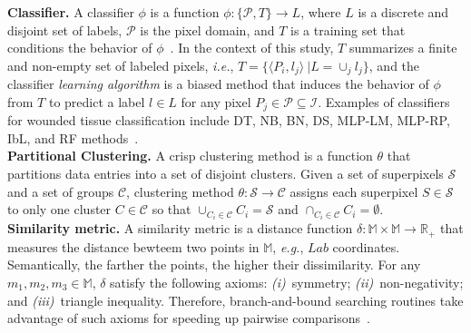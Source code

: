 \noindent
\textbf{Classifier.}
A classifier $\phi$ is a function $\phi: \{\mathcal{P}, T\} \rightarrow L$, where $L$ is a discrete and disjoint set of labels, $\mathcal{P}$ is the pixel domain, and $T$ is a training set that conditions the behavior of $\phi$~\cite{Aggarwal2015}.
In the context of this study, $T$ summarizes a finite and non-empty set of labeled pixels, \textit{i.e.}, $T = \{\langle P_i, l_j\rangle~| L = \cup_j l_j\}$, and the classifier \textit{learning algorithm} is a biased method that induces the behavior of $\phi$ from $T$ to predict a label $l \in L$ for any pixel $P_j \in \mathcal{P} \subseteq \mathcal{I}$.
Examples of classifiers for wounded tissue classification include DT, NB, BN, DS, MLP-LM, MLP-RP, IbL, and RF methods~\cite{Blanco2016,Chino2018,Veredas2010,Kavitha2017}.\\


\noindent
\textbf{Partitional Clustering.} 
A crisp clustering method is a function $\theta$ that partitions data entries into a set of disjoint clusters.
Given a set of superpixels $\mathcal{S}$ and a set of groups $\mathcal{C}$, clustering method $\theta: \mathcal{S} \rightarrow \mathcal{C}$ assigns each superpixel $S \in \mathcal{S}$ to only one cluster $C \in \mathcal{C}$ so that $\cup_{C_i \in \mathcal{C}} C_i = \mathcal{S}$ and $\cap_{C_i \in \mathcal{C}} C_i = \emptyset$.\\


\noindent
\textbf{Similarity metric.} 
A similarity metric is a distance function $\delta: \mathbb{M} \times \mathbb{M} \rightarrow \mathbb{R}_{+}$ that measures the distance bewteem two points in $\mathbb{M}$, \textit{e.g.}, $Lab$ coordinates.
Semantically, the farther the points, the higher their dissimilarity.
For any $m_1, m_2, m_3 \in \mathbb{M}$, $\delta$ satisfy the following axioms: 
\textit{(i)}~symmetry; 
\textit{(ii)}~non-negativity; and 
\textit{(iii)}~triangle inequality.
Therefore, branch-and-bound searching routines take advantage of such axioms for speeding up pairwise comparisons~\cite{Hetland2009}.



